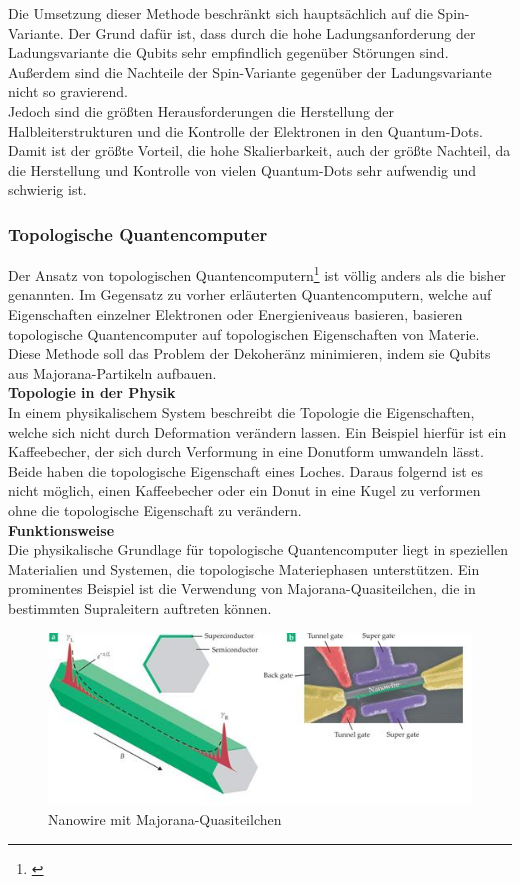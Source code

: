 Die Umsetzung dieser Methode beschränkt sich hauptsächlich auf die Spin-Variante. Der Grund dafür ist, dass durch die hohe Ladungsanforderung der Ladungsvariante die Qubits sehr empfindlich gegenüber Störungen sind.
Außerdem sind die Nachteile der Spin-Variante gegenüber der Ladungsvariante nicht so gravierend.\\
Jedoch sind die größten Herausforderungen die Herstellung der Halbleiterstrukturen und die Kontrolle der Elektronen in den Quantum-Dots.
Damit ist der größte Vorteil, die hohe Skalierbarkeit, auch der größte Nachteil, da die Herstellung und Kontrolle von vielen Quantum-Dots sehr aufwendig und schwierig ist.\\

\subsubsection{Topologische Quantencomputer}
\label{subsub:topologische_quantencomputer}
Der Ansatz von topologischen Quantencomputern\footnote{\cite{nayak_non-abelian_2008}} ist völlig anders als die bisher genannten. Im Gegensatz zu vorher erläuterten Quantencomputern, welche auf Eigenschaften einzelner Elektronen oder Energieniveaus basieren, basieren topologische Quantencomputer auf topologischen Eigenschaften von Materie.\\
Diese Methode soll das Problem der Dekoheränz minimieren, indem sie Qubits aus Majorana-Partikeln aufbauen.\\

\textbf{Topologie in der Physik}\\
In einem physikalischem System beschreibt die Topologie die Eigenschaften, welche sich nicht durch Deformation verändern lassen.
Ein Beispiel hierfür ist ein Kaffeebecher, der sich durch Verformung in eine Donutform umwandeln lässt. Beide haben die topologische Eigenschaft eines Loches.
Daraus folgernd ist es nicht möglich, einen Kaffeebecher oder ein Donut in eine Kugel zu verformen ohne die topologische Eigenschaft zu verändern.\\

\textbf{Funktionsweise}\\
Die physikalische Grundlage für topologische Quantencomputer liegt in speziellen Materialien und Systemen, die topologische Materiephasen unterstützen.
Ein prominentes Beispiel ist die Verwendung von Majorana-Quasiteilchen, die in bestimmten Supraleitern auftreten können.\\

\begin{figure}[H]
    \centering
    \includegraphics[width=0.75\linewidth]{img/Majorana.png}
    \caption{Nanowire mit Majorana-Quasiteilchen \cite{aguado_majorana_2020}}
    \label{fig:Majorana}
\end{figure}


